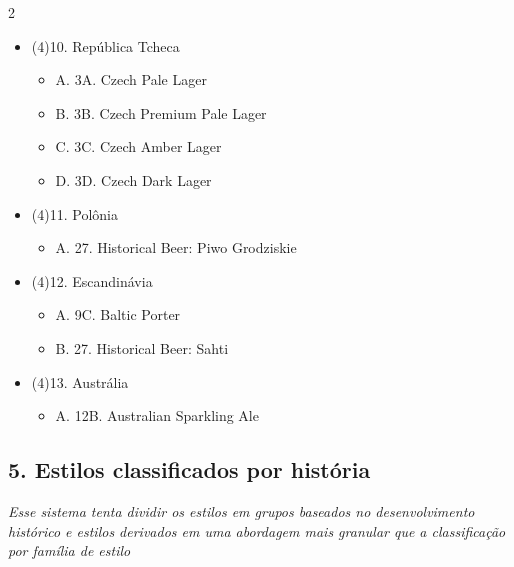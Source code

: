 \begin{multicols*}{2}
\begin{itemize}[noitemsep]
\begin{itemize}
  \item[] A. 7A. Vienna Lager
\end{itemize}
\item[] (4)10. República Tcheca
\begin{itemize}
  \item[] A. 3A. Czech Pale Lager
  \item[] B. 3B. Czech Premium Pale Lager
  \item[] C. 3C. Czech Amber Lager
  \item[] D. 3D. Czech Dark Lager
\end{itemize}
\item[] (4)11. Polônia
\begin{itemize}
  \item[] A. 27. Historical Beer: Piwo Grodziskie
\end{itemize}
\item[] (4)12. Escandinávia
\begin{itemize}
  \item[] A. 9C. Baltic Porter
  \item[] B. 27. Historical Beer: Sahti
\end{itemize}
\item[] (4)13. Austrália
\begin{itemize}
  \item[] A. 12B. Australian Sparkling Ale
\end{itemize}
\end{itemize}

\subsection*{5. Estilos classificados por história}

\textit{Esse sistema tenta dividir os estilos em grupos baseados no desenvolvimento histórico e estilos derivados em uma abordagem mais granular que a classificação por família de estilo}


\end{multicols*}
